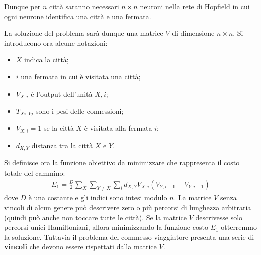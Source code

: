 Dunque per $n$ città saranno necessari $n \times n$ neuroni nella rete di Hopfield in cui ogni neurone identifica una città e una fermata.

\newpage

La soluzione del problema sarà dunque una matrice $V$ di dimensione $n \times n$. Si introducono ora alcune notazioni:
\begin{itemize}
	\item $X$ indica la città;
	\item $i$ una fermata in cui è visitata una città;
	\item $V_{X,i}$ è l'output dell'unità $X, i$;
	\item $T_{Xi, Yj}$ sono i pesi delle connessioni;
	\item $V_{X,i} = 1$ se la città $X$ è visitata alla fermata $i$;
	\item $d_{X,Y}$ distanza tra la città $X$ e $Y$.
\end{itemize}

Si definisce ora la funzione obiettivo da minimizzare che rappresenta il costo totale del cammino:
\begin{align*}
	E_1  = \frac{D}{2} \sum_X \sum_{Y \neq X} \sum_i d_{X,Y} V_{X,i} (V_{Y, i-1} + V_{Y, i+1})
\end{align*}
dove $D$ è una costante e gli indici sono intesi modulo $n$. La matrice $V$ senza vincoli di alcun genere può descrivere zero o più percorsi di lunghezza arbitraria (quindi può anche non toccare tutte le città).
Se la matrice $V$ descrivesse solo percorsi unici Hamiltoniani, allora minimizzando la funzione costo $E_1$ otterremmo la soluzione. Tuttavia il problema del commesso viaggiatore presenta una serie di \textbf{vincoli} che devono essere rispettati dalla matrice $V$.


